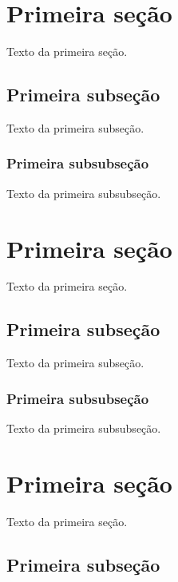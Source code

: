 \documentclass[a4paper,12pt,oneside,onecolumn,final,fleqn]{config/repUERJ}
\begin{document}
\section{Primeira seção}

Texto da primeira seção.

\subsection{Primeira subseção}

Texto da primeira subseção.

\subsubsection{Primeira subsubseção}

Texto da primeira subsubseção.
\section{Primeira seção}

Texto da primeira seção.

\subsection{Primeira subseção}

Texto da primeira subseção.

\subsubsection{Primeira subsubseção}

Texto da primeira subsubseção.
\annex%
\section{Primeira seção}

Texto da primeira seção.

\subsection{Primeira subseção}
\end{document}
